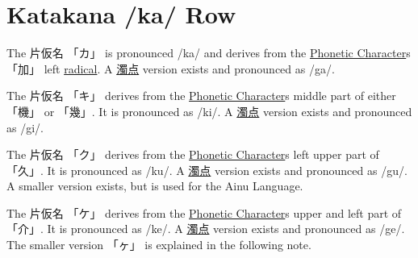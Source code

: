 \section{Katakana /ka/ Row}\label{sec:KatakanaKaRow}


\label{letter:ka} The  片仮名 {「カ」} is pronounced  /ka/ and  derives from the
\hyperref[sec:PhoneticCharacter]{Phonetic Character}s {「加」} left
\hyperref[sec:Radical]{radical}.  A \hyperref[sec:Dakuten]{濁点} version exists
and pronounced as /ga/.




\label{letter:ki} The 片仮名 {「キ」} derives from the
\hyperref[sec:PhoneticCharacter]{Phonetic Character}s middle part of either {「機」} or
{「幾」}.  It is pronounced as /ki/.  A \hyperref[sec:Dakuten]{濁点} version
exists and pronounced as /gi/.


\label{letter:ku} The 片仮名 {「ク」} derives from the
\hyperref[sec:PhoneticCharacter]{Phonetic Character}s left upper part of {「久」}.  It
is pronounced as /ku/.  A \hyperref[sec:Dakuten]{濁点} version exists and
pronounced as /gu/.  A smaller version exists, but is used for the Ainu
Language.



\label{letter:ke} The 片仮名 {「ケ」} derives from the
\hyperref[sec:PhoneticCharacter]{Phonetic Character}s upper and left part of {「介」}.
It is pronounced as /ke/.  A \hyperref[sec:Dakuten]{濁点} version exists and
pronounced as /ge/.  The smaller version {「ヶ」} is explained in the following
note.

\newpage


